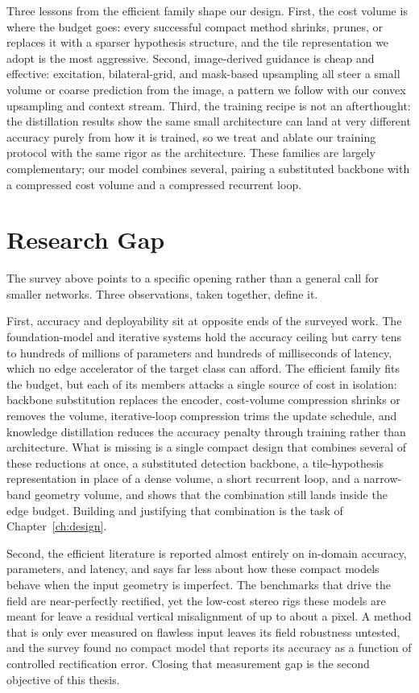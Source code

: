 Three lessons from the efficient family shape our design.
First, the cost volume is where the budget goes:
every successful compact method shrinks, prunes, or replaces it with a
sparser hypothesis structure, and the tile representation we adopt is the
most aggressive. Second, image-derived guidance is cheap and effective:
excitation, bilateral-grid, and mask-based upsampling all steer a small
volume or coarse prediction from the image, a pattern we follow with our
convex upsampling and context stream. Third, the training recipe is
not an afterthought: the distillation results show the same small
architecture can land at very different accuracy purely from how it is
trained, so we treat and ablate our training protocol with the same
rigor as the architecture. These families are largely
complementary; our model combines several, pairing a substituted
backbone with a compressed cost volume and a compressed recurrent loop.

\FloatBarrier
\section{Research Gap}
\label{sec:research_gap}
The survey above points to a specific opening rather than a general call
for smaller networks. Three observations, taken together, define it.

First, accuracy and deployability sit at opposite ends of the surveyed
work. The foundation-model and iterative systems hold the accuracy
ceiling but carry tens to hundreds of millions of parameters and hundreds
of milliseconds of latency, which no edge accelerator of the target class
can afford. The efficient family fits the budget, but each of its members
attacks a single source of cost in isolation: backbone substitution
replaces the encoder, cost-volume compression shrinks or removes the
volume, iterative-loop compression trims the update schedule, and
knowledge distillation reduces the accuracy penalty through training
rather than architecture. What is missing is a single compact design that
combines several of these reductions at once, a substituted detection
backbone, a tile-hypothesis representation in place of a dense volume, a
short recurrent loop, and a narrow-band geometry volume, and shows that
the combination still lands inside the edge budget. Building and
justifying that combination is the task of Chapter~\ref{ch:design}.

Second, the efficient literature is reported almost entirely on
in-domain accuracy, parameters, and latency, and says far less about how
these compact models behave when the input geometry is imperfect. The
benchmarks that drive the field are near-perfectly rectified, yet the
low-cost stereo rigs these models are meant for leave a residual vertical
misalignment of up to about a pixel. A method that is only ever measured
on flawless input leaves its field robustness untested, and the survey
found no compact model that reports its accuracy as a function of
controlled rectification error. Closing that measurement gap is the
second objective of this thesis.

